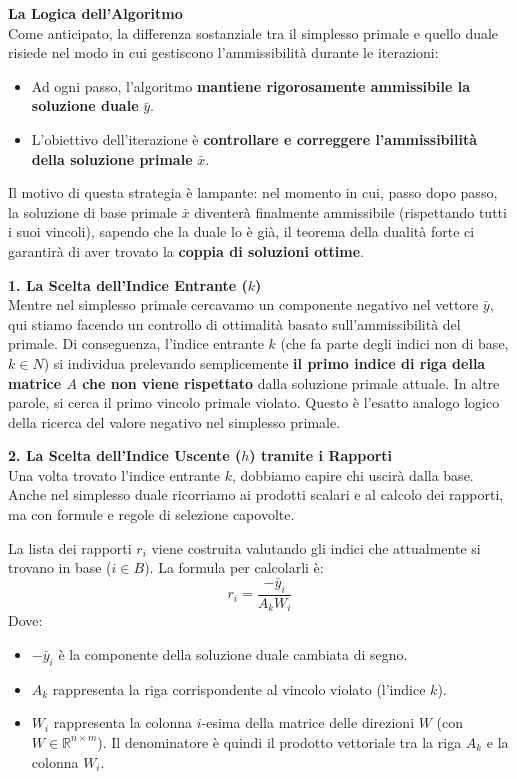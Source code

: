 \documentclass[12pt, a4paper]{article}
\begin{document}
	\vspace{0.4cm}
	\textbf{La Logica dell'Algoritmo}\\
	Come anticipato, la differenza sostanziale tra il simplesso primale e quello duale risiede nel modo in cui gestiscono l'ammissibilità durante le iterazioni:
	\begin{itemize}[label=\textcolor{titlecolor}{\Large\textbullet}, itemsep=2pt, leftmargin=1.5cm]
		\item Ad ogni passo, l'algoritmo \textbf{mantiene rigorosamente ammissibile la soluzione duale} $\bar{y}$.
		\item L'obiettivo dell'iterazione è \textbf{controllare e correggere l'ammissibilità della soluzione primale} $\bar{x}$.
	\end{itemize}
	Il motivo di questa strategia è lampante: nel momento in cui, passo dopo passo, la soluzione di base primale $\bar{x}$ diventerà finalmente ammissibile (rispettando tutti i suoi vincoli), sapendo che la duale lo è già, il teorema della dualità forte ci garantirà di aver trovato la \textbf{coppia di soluzioni ottime}.
	
	\vspace{0.4cm}
	\textbf{1. La Scelta dell'Indice Entrante ($k$)}\\
	Mentre nel simplesso primale cercavamo un componente negativo nel vettore $\bar{y}$, qui stiamo facendo un controllo di ottimalità basato sull'ammissibilità del primale. 
	Di conseguenza, l'indice entrante $k$ (che fa parte degli indici non di base, $k \in N$) si individua prelevando semplicemente \textbf{il primo indice di riga della matrice $A$ che non viene rispettato} dalla soluzione primale attuale. In altre parole, si cerca il primo vincolo primale violato. Questo è l'esatto analogo logico della ricerca del valore negativo nel simplesso primale.
	
	\vspace{0.4cm}
	\textbf{2. La Scelta dell'Indice Uscente ($h$) tramite i Rapporti}\\
	Una volta trovato l'indice entrante $k$, dobbiamo capire chi uscirà dalla base. Anche nel simplesso duale ricorriamo ai prodotti scalari e al calcolo dei rapporti, ma con formule e regole di selezione capovolte.
	
	La lista dei rapporti $r_i$ viene costruita valutando gli indici che attualmente si trovano in base ($i \in B$). La formula per calcolarli è:
	\[
	r_i = \frac{-\bar{y}_i}{A_k W_i}
	\]
	Dove:
	\begin{itemize}[label=$\circ$, itemsep=2pt, leftmargin=1.5cm]
		\item $-\bar{y}_i$ è la componente della soluzione duale cambiata di segno.
		\item $A_k$ rappresenta la riga corrispondente al vincolo violato (l'indice $k$).
		\item $W_i$ rappresenta la colonna $i$-esima della matrice delle direzioni $W$ (con $W \in \mathbb{R}^{n \times m}$). Il denominatore è quindi il prodotto vettoriale tra la riga $A_k$ e la colonna $W_i$.
	\end{itemize}
	
\end{document}
